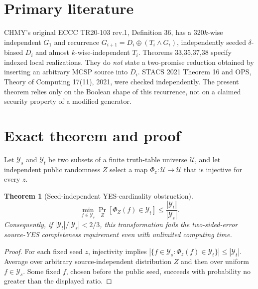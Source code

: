 \documentclass[11pt]{article}
\newtheorem{theorem}{Theorem}
\begin{document}
\section*{Primary literature}
CHMY's original ECCC TR20-103 rev.1, Definition 36, has a 320$k$-wise independent $G_1$ and recurrence $G_{i+1}=D_i\oplus(T_i\wedge G_i)$, independently seeded $\delta$-biased $D_i$ and almost $k$-wise-independent $T_i$. Theorems 33,35,37,38 specify indexed local realizations. They do \emph{not} state a two-promise reduction obtained by inserting an arbitrary MCSP source into $D_i$. STACS 2021 Theorem 16 and OPS, Theory of Computing 17(11), 2021, were checked independently. The present theorem relies only on the Boolean shape of this recurrence, not on a claimed security property of a modified generator.

\section*{Exact theorem and proof}
Let $\mathcal Y_s$ and $\mathcal Y_t$ be two subsets of a finite truth-table universe $\mathcal U$, and let independent public randomness $Z$ select a map $\Phi_z:\mathcal U\to\mathcal U$ that is injective for every $z$.
\begin{theorem}[Seed-independent YES-cardinality obstruction]
\[
\boxed{\min_{f\in\mathcal Y_s}\Pr_Z[\Phi_Z(f)\in\mathcal Y_t]\le
\frac{|\mathcal Y_t|}{|\mathcal Y_s|}.}
\]
Consequently, if $|\mathcal Y_t|/|\mathcal Y_s|<2/3$, this transformation fails the two-sided-error source-YES completeness requirement even with unlimited computing time.
\end{theorem}
\begin{proof}
For each fixed seed $z$, injectivity implies
$|\{f\in\mathcal Y_s:\Phi_z(f)\in\mathcal Y_t\}|\le|\mathcal Y_t|$.
Average over arbitrary source-independent distribution $Z$ and then over uniform $f\in\mathcal Y_s$. Some fixed $f$, chosen before the public seed, succeeds with probability no greater than the displayed ratio.
\end{proof}
\end{document}
